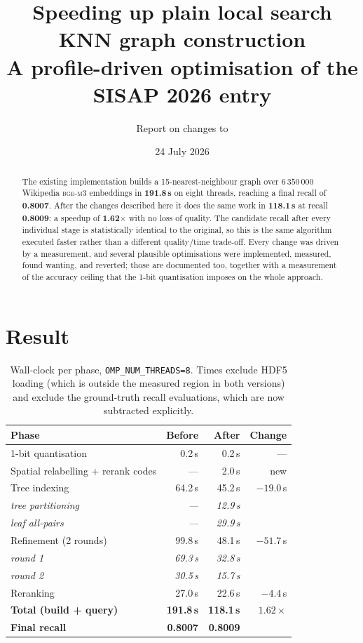 \documentclass[11pt,a4paper]{article}
\title{\textbf{Speeding up plain local search KNN graph construction}\\[2pt]
\large A profile-driven optimisation of the SISAP 2026 entry}
\author{Report on changes to \code{sisap2026-plain-local-search}}
\date{24 July 2026}
\newcommand{\code}[1]{\texttt{\small #1}}
\begin{document}
\maketitle

\begin{abstract}
\noindent
The existing implementation builds a 15-nearest-neighbour graph over
$6\,350\,000$ Wikipedia \textsc{bge-m3} embeddings in \textbf{191.8\,s} on eight
threads, reaching a final recall of \textbf{0.8007}. After the changes described
here it does the same work in \textbf{118.1\,s} at recall \textbf{0.8009}: a
speedup of \textbf{1.62$\times$} with no loss of quality. The candidate recall
after every individual stage is statistically identical to the original, so this
is the same algorithm executed faster rather than a different quality/time
trade-off. Every change was driven by a measurement, and several plausible
optimisations were implemented, measured, found wanting, and reverted; those are
documented too, together with a measurement of the accuracy ceiling that the
1-bit quantisation imposes on the whole approach.
\end{abstract}

\section{Result}

\begin{table}[h]
\centering
\begin{tabular}{lrrr}
\toprule
Phase & Before & After & Change \\
\midrule
1-bit quantisation            & 0.2\,s   & 0.2\,s   & --- \\
Spatial relabelling + rerank codes & ---      & 2.0\,s   & new \\
Tree indexing                 & 64.2\,s  & 45.2\,s  & $-19.0$\,s \\
\quad \emph{tree partitioning}   & \emph{---} & \emph{12.9\,s} & \\
\quad \emph{leaf all-pairs}      & \emph{---} & \emph{29.9\,s} & \\
Refinement (2 rounds)         & 99.8\,s  & 48.1\,s  & $-51.7$\,s \\
\quad \emph{round 1}             & \emph{69.3\,s} & \emph{32.8\,s} & \\
\quad \emph{round 2}             & \emph{30.5\,s} & \emph{15.7\,s} & \\
Reranking                     & 27.0\,s  & 22.6\,s  & $-4.4$\,s \\
\midrule
\textbf{Total (build + query)} & \textbf{191.8\,s} & \textbf{118.1\,s} & $\mathbf{1.62\times}$ \\
\textbf{Final recall}          & \textbf{0.8007}   & \textbf{0.8009}   & \\
\bottomrule
\end{tabular}
\caption{Wall-clock per phase, \code{OMP\_NUM\_THREADS=8}. Times exclude HDF5
loading (which is outside the measured region in both versions) and exclude the
ground-truth recall evaluations, which are now subtracted explicitly.}
\end{table}
\end{document}
